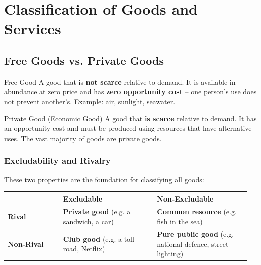 \documentclass[11pt, a4paper, twoside]{book}
\begin{document}
\section{Classification of Goods and Services}



\subsection{Free Goods vs. Private Goods}

\begin{keyterm}{Free Good}
A good that is \textbf{not scarce} relative to demand. It is available in abundance at zero price and has \textbf{zero opportunity cost} -- one person's use does not prevent another's. Example: air, sunlight, seawater.
\end{keyterm}

\begin{keyterm}{Private Good (Economic Good)}
A good that \textbf{is scarce} relative to demand. It has an opportunity cost and must be produced using resources that have alternative uses. The vast majority of goods are private goods.
\end{keyterm}

\subsubsection{Excludability and Rivalry}

These two properties are the foundation for classifying all goods:

\begin{tcolorbox}[
  enhanced, colback=LightBlue, colframe=NavyPrimary,
  arc=0pt, boxrule=0.7pt
]
\begin{tabular}{@{}>{\RaggedRight\arraybackslash}p{0.22\linewidth}>{\RaggedRight\arraybackslash}p{0.37\linewidth}>{\RaggedRight\arraybackslash}p{0.37\linewidth}@{}}
& \textbf{\color{NavyPrimary}Excludable} & \textbf{\color{NavyPrimary}Non-Excludable} \\
\midrule
\textbf{Rival} & \textbf{Private good} \newline (e.g. a sandwich, a car) & \textbf{Common resource} \newline (e.g. fish in the sea) \\
\addlinespace
\textbf{Non-Rival} & \textbf{Club good} \newline (e.g. a toll road, Netflix) & \textbf{Pure public good} \newline (e.g. national defence, street lighting) \\
\end{tabular}
\end{tcolorbox}
\end{document}
